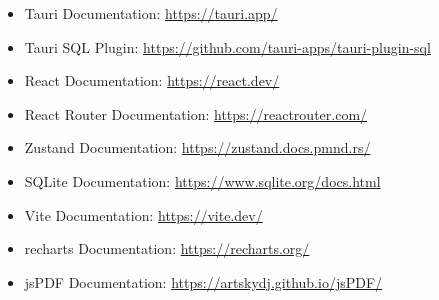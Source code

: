 \documentclass[12pt, a4paper]{report}
\begin{document}
	\begin{itemize}
		\item Tauri Documentation: \url{https://tauri.app/}
		\item Tauri SQL Plugin: \url{https://github.com/tauri-apps/tauri-plugin-sql}
		\item React Documentation: \url{https://react.dev/}
		\item React Router Documentation: \url{https://reactrouter.com/}
		\item Zustand Documentation: \url{https://zustand.docs.pmnd.rs/}
		\item SQLite Documentation: \url{https://www.sqlite.org/docs.html}
		\item Vite Documentation: \url{https://vite.dev/}
		\item recharts Documentation: \url{https://recharts.org/}
		\item jsPDF Documentation: \url{https://artskydj.github.io/jsPDF/}
	\end{itemize}
\end{document}
